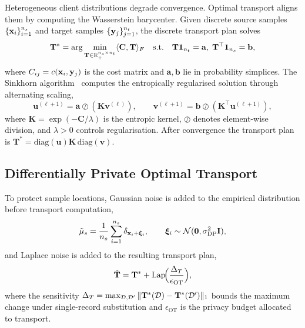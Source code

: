 Heterogeneous client distributions degrade convergence. Optimal transport aligns them by computing the Wasserstein barycenter. Given discrete source samples $\{\mathbf{x}_i\}_{i=1}^{n_s}$ and target samples $\{\mathbf{y}_j\}_{j=1}^{n_t}$, the discrete transport plan solves
\begin{equation}
\mathbf{T}^* = \arg\min_{\mathbf{T}\in\mathbb{R}_+^{n_s\times n_t}}
\langle\mathbf{C},\mathbf{T}\rangle_F
\quad\text{s.t.}\quad
\mathbf{T}\mathbf{1}_{n_t}=\mathbf{a},\;
\mathbf{T}^\top\mathbf{1}_{n_s}=\mathbf{b},
\label{eq:fed_ot}
\end{equation}
where $C_{ij}=c(\mathbf{x}_i,\mathbf{y}_j)$ is the cost matrix and $\mathbf{a},\mathbf{b}$ lie in probability simplices. The Sinkhorn algorithm~\cite{Cuturi2013,Chizat2020,Villani2009} computes the entropically regularised solution through alternating scaling,
\begin{equation}
\mathbf{u}^{(\ell+1)} = \mathbf{a}\oslash(\mathbf{K}\mathbf{v}^{(\ell)}),
\qquad
\mathbf{v}^{(\ell+1)} = \mathbf{b}\oslash(\mathbf{K}^\top\mathbf{u}^{(\ell+1)}),
\label{eq:sinkhorn}
\end{equation}
where $\mathbf{K}=\exp(-\mathbf{C}/\lambda)$ is the entropic kernel, $\oslash$ denotes element-wise division, and $\lambda>0$ controls regularisation. After convergence the transport plan is $\mathbf{T}^*=\mathrm{diag}(\mathbf{u})\mathbf{K}\,\mathrm{diag}(\mathbf{v})$.

\subsection{Differentially Private Optimal Transport}

To protect sample locations, Gaussian noise is added to the empirical distribution before transport computation,
\begin{equation}
\tilde{\mu}_s = \frac{1}{n_s}\sum_{i=1}^{n_s}\delta_{\mathbf{x}_i+\bm{\xi}_i},
\qquad \bm{\xi}_i\sim\mathcal{N}(\mathbf{0},\sigma_{\mathrm{DP}}^2\mathbf{I}),
\label{eq:fed_dp_ot_dist}
\end{equation}
and Laplace noise is added to the resulting transport plan,
\begin{equation}
\tilde{\mathbf{T}} = \mathbf{T}^*
+ \mathrm{Lap}\!\Bigl(\frac{\Delta_T}{\epsilon_{\mathrm{OT}}}\Bigr),
\label{eq:fed_dp_ot_plan}
\end{equation}
where the sensitivity $\Delta_T=\max_{\mathcal{D},\mathcal{D}'}\|\mathbf{T}^*(\mathcal{D})-\mathbf{T}^*(\mathcal{D}')\|_1$ bounds the maximum change under single-record substitution and $\epsilon_{\mathrm{OT}}$ is the privacy budget allocated to transport.

